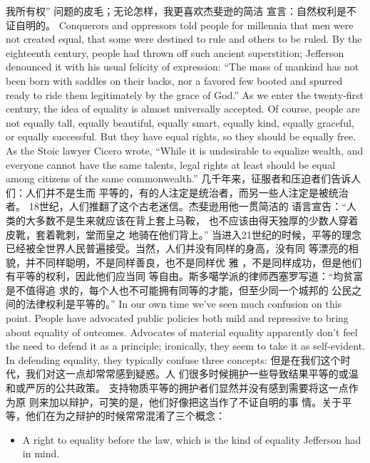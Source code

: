 \begin{paracol}{2}
我所有权” 问题的皮毛；无论怎样，我更喜欢杰斐逊的简洁
宣言：自然权利是不证自明的。
\switchcolumn*
Conquerors and oppressors told people for millennia that
men were not created equal, that some were destined to rule and
others to be ruled. By the eighteenth century, people had
thrown off such ancient superstition; Jefferson denounced it
with his usual felicity of expression: ``The mass of mankind has
not been born with saddles on their backs, nor a favored few
booted and spurred ready to ride them legitimately by the grace
of God.'' As we enter the twenty-first century, the idea of equality is almost universally accepted. Of course, people are not
equally tall, equally beautiful, equally smart, equally kind,
equally graceful, or equally successful. But they have equal
rights, so they should be equally free. As the Stoic lawyer Cicero
wrote, ``While it is undesirable to equalize wealth, and everyone
cannot have the same talents, legal rights at least should be
equal among citizens of the same commonwealth.''
\switchcolumn
几千年来，征服者和压迫者们告诉人们：人们并不是生而
平等的，有的人注定是统治者，而另一些人注定是被统治者。
18世纪，人们推翻了这个古老迷信。杰斐逊用他一贯简洁的
语言宣告：“人类的大多数不是生来就应该在背上套上马鞍，
也不应该由得天独厚的少数人穿着皮靴，套着靴刺，堂而皇之
地骑在他们背上。” 当进入21世纪的时候，平等的理念已经被全世界人民普遍接受。当然，人们并没有同样的身高，没有同
等漂亮的相貌，并不同样聪明，不是同样善良，也不是同样优
雅 ，不是同样成功，但是他们有平等的权利，因此他们应当同
等自由。斯多噶学派的律师西塞罗写道：“均贫富是不值得追
求的，每个人也不可能拥有同等的才能，但至少同一个城邦的
公民之间的法律权利是平等的。”
\switchcolumn*
In our own time we've seen much confusion on this point.
People have advocated public policies both mild and repressive
to bring about equality of outcomes. Advocates of material
equality apparently don't feel the need to defend it as a principle; ironically, they seem to take it as self-evident. In defending
equality, they typically confuse three concepts:
\switchcolumn
但是在我们这个时代，我们对这一点却常常感到疑惑。人
们很多时候拥护一些导致结果平等的或温和或严厉的公共政策。
支持物质平等的拥护者们显然并没有感到需要将这一点作为原
则来加以辩护，可笑的是，他们好像把这当作了不证自明的事
情。关于平等，他们在为之辩护的时候常常混淆了三个概念：
\switchcolumn*
\begin{itemize}
	\item A right to equality before the law, which is the kind of equality Jefferson had in mind.
\end{itemize}
\switchcolumn
\begin{itemize}

\end{itemize}
\end{paracol}
